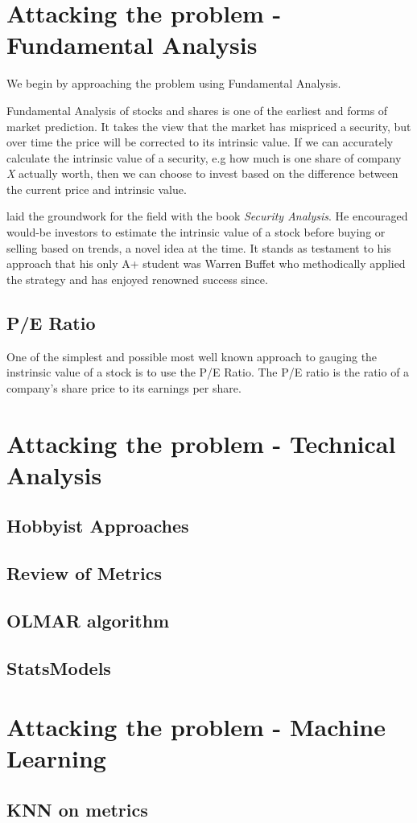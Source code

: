 \documentclass{report}
\begin{document}
\section{Attacking the problem - Fundamental Analysis}

We begin by approaching the problem using Fundamental Analysis. 

Fundamental Analysis of stocks and shares is one of the earliest and forms of market prediction. It takes the view that the market has mispriced a security, but over time the price will be corrected to its intrinsic value. If we can accurately calculate the intrinsic value of a security, e.g how much is one share of company \textit{X} actually worth, then we can choose to invest based on the difference between the current price and intrinsic value. 

\citet{graham1934security} laid the groundwork for the field with the book \textit{Security Analysis}. He encouraged would-be investors to estimate the intrinsic value of a stock before buying or selling based on trends, a novel idea at the time. It stands as testament to his approach that his only A+ student was Warren Buffet who methodically applied the strategy and has enjoyed renowned success since. \cite{schroeder2008snowball}

\subsection{P/E Ratio}

One of the simplest and possible most well known approach to gauging the instrinsic value of a stock is to use the P/E Ratio. The P/E ratio is the ratio of a company's share price to its earnings per share. 

\section{Attacking the problem - Technical Analysis}
\subsection{Hobbyist Approaches}
\subsection{Review of Metrics}
\subsection{OLMAR algorithm}
\subsection{StatsModels}

\section{Attacking the problem - Machine Learning}
\subsection{KNN on metrics}

\cite {website:pybrain-tutorial}



\end{document}
